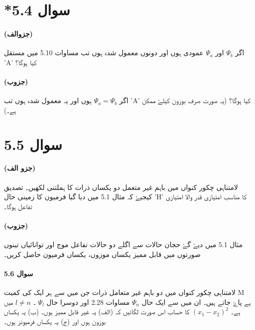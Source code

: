 \section*{*سوال 5.4}
\paragraph*{(جزوالف)}
اگر $ \Psi_{b} $ اور  $ \Psi_{a} $ عمودی ہوں اور دونوں معمول شدہ ہوں تب مساوات 5.10 میں مستقل 'A' کیا ہوگا؟ 
\paragraph*{(جزوب)}
اگر  $ \Psi_{a} = \Psi_{b} $ ہوں اور یہ معمول شدہ ہوں تب 'A' کیا ہوگا؟ (یہ صورت صرف بوزون کیلۓ ممکن ہے۔)
\section*{سوال 5.5} 
\paragraph*{(جزو الف)}
لامتناہی چکور کنواں میں باہم غیر متعمل دو یکساں ذرات کا ہملتنی لکھیں۔ تصدیق کیجیۓ کہ مثال 5.1 میں دیا گیا فرمیون کا زمینی حال 'H' کا مناسب امتیازی قدر والا امتیازی تفاعل ہوگا۔ 
\paragraph*{(جزوب)}
مثال 5.1 میں دیۓ گۓ حجان حالات سے اگلے دو حالات تفاعل موج اور توانائیاں تینوں صورتوں میں قابل ممیز یکساں موزوں، یکساں فرمیون حاصل کریں۔




\paragraph*{سوال 5.6}
لامتناہی چکور کنواں میں دو باہم غیر متعامل ذرات جن میں سے ہر ایک کی کمیت M ہے پاۓ جاتے ہیں۔ ان میں سے ایک حال $ \Psi_{n} $ مساوات 2.28 اور دوسرا حال $  \Psi _{l} $ ۔ $ l\neq n $  میں ہے۔ $ (x_{1} - x_{2})^2 $ کا حساب اس صورت لگائیں کہ (الف) یہ غیر قابل ممیز ہوں۔ (ب) یہ یکساں بوزون ہوں اور (ج) یہ یکساں فرمیونز ہوں۔
